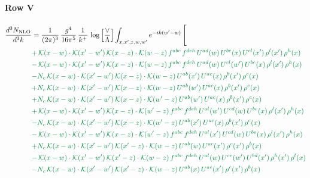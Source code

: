 \documentclass[10pt]{article}
\numberwithin{equation}{section}
\begin{document}
\paragraph{Row V}
\begin{align}
\frac{d^{3}N_{\mathrm{NLO}}}{d^{3}k} & = \frac{1}{(2\pi)^{3}}\,\frac{g^{4}}{16\pi^{5}}\,\frac{1}{k^{+}}\,\log\Big[\frac{\vee}{\Lambda}\Big]\int_{x,x',z,w,w'}e^{-ik(w'-w)}\,\Bigg[\notag\\ &{\color{JIM}  +\,\mathcal{K}(x-w)\cdot\mathcal{K}(x'-w')\,\mathcal{K}(x-z)\cdot\mathcal{K}(w-z)\,f^{abc}\,f^{deh}\,U^{ad}(w)\,U^{be}(x)\,U^{cl}(x')\,\rho^{l}(x')\,\rho^{h}(x)} \notag\\
&{\color{JIM} -\,\mathcal{K}(x-w)\cdot\mathcal{K}(x'-w')\,\mathcal{K}(x-z)\cdot\mathcal{K}(w-z)\,f^{abc}\,f^{deh}\,U^{ad}(w)\,U^{cl}(w')\,U^{be}(x)\,\rho^{l}(x')\,\rho^{h}(x)} \notag\\
&{\color{JIM} -N_{c}\,\mathcal{K}(x-w)\cdot\mathcal{K}(x'-w')\,\mathcal{K}(x-z)\cdot\mathcal{K}(w-z)\,U^{ab}(x')\,U^{ac}(x)\,\rho^{b}(x')\,\rho^{c}(x)} \notag\\
&{\color{JIM} +N_{c}\,\mathcal{K}(x-w)\cdot\mathcal{K}(x'-w')\,\mathcal{K}(x-z)\cdot\mathcal{K}(w-z)\,U^{ab}(w')\,U^{ac}(x)\,\rho^{b}(x')\,\rho^{c}(x)} \notag\\
&{\color{JIM} +N_{c}\,\mathcal{K}(x-w)\cdot\mathcal{K}(x'-w')\,\mathcal{K}(x-z)\cdot\mathcal{K}(w'-z)\,U^{ab}(w')\,U^{ac}(x)\,\rho^{b}(x')\,\rho^{c}(x)} \notag\\
&{\color{JIM} +\,\mathcal{K}(x-w)\cdot\mathcal{K}(x'-w')\,\mathcal{K}(x-z)\cdot\mathcal{K}(w'-z)\,f^{abc}\,f^{deh}\,U^{al}(w')\,U^{cd}(w)\,U^{be}(x)\,\rho^{l}(x')\,\rho^{h}(x)} \notag\\
&{\color{JIM} -N_{c}\,\mathcal{K}(x-w)\cdot\mathcal{K}(x'-w')\,\mathcal{K}(x-z)\cdot\mathcal{K}(w'-z)\,U^{ab}(x')\,U^{ac}(x)\,\rho^{b}(x')\,\rho^{c}(x)} \notag\\
&{\color{JIM} -\,\mathcal{K}(x-w)\cdot\mathcal{K}(x'-w')\,\mathcal{K}(x-z)\cdot\mathcal{K}(w'-z)\,f^{abc}\,f^{deh}\,U^{al}(x')\,U^{cd}(w)\,U^{be}(x)\,\rho^{l}(x')\,\rho^{h}(x)} \notag\\
&{\color{JIM} +N_{c}\,\mathcal{K}(x-w)\cdot\mathcal{K}(x'-w')\,\mathcal{K}(x'-z)\cdot\mathcal{K}(w-z)\,U^{ab}(w)\,U^{ac}(x')\,\rho^{c}(x')\,\rho^{b}(x)} \notag\\
&{\color{JIM} -\,\mathcal{K}(x-w)\cdot\mathcal{K}(x'-w')\,\mathcal{K}(x'-z)\cdot\mathcal{K}(w-z)\,f^{abc}\,f^{deh}\,U^{al}(w)\,U^{ce}(w')\,U^{bd}(x')\,\rho^{h}(x')\,\rho^{l}(x)} \notag\\
&{\color{JIM} -N_{c}\,\mathcal{K}(x-w)\cdot\mathcal{K}(x'-w')\,\mathcal{K}(x'-z)\cdot\mathcal{K}(w-z)\,U^{ab}(x)\,U^{ac}(x')\,\rho^{c}(x')\,\rho^{b}(x)} \notag\\

\end{align}
\end{document}
